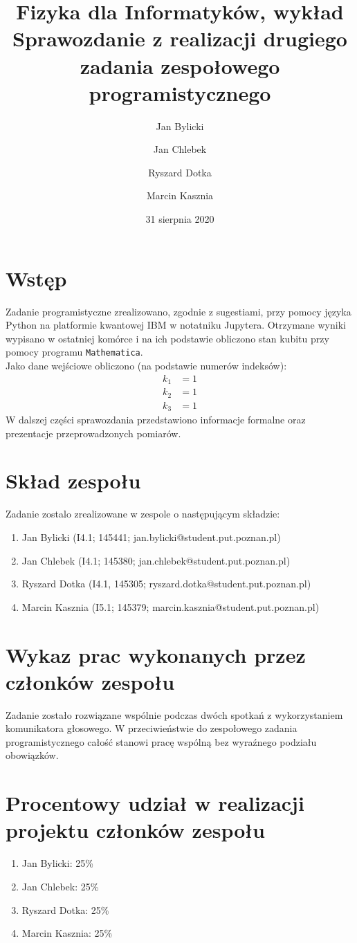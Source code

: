 \documentclass{article}
\title{Fizyka dla Informatyków, wykład\\ Sprawozdanie z realizacji drugiego zadania zespołowego programistycznego}
\author{Jan Bylicki \and Jan Chlebek \and Ryszard Dotka \and Marcin Kasznia}
\date{31 sierpnia 2020}
\begin{document}
\maketitle

\section{Wstęp}
Zadanie programistyczne zrealizowano, zgodnie z sugestiami, przy pomocy języka Python na platformie kwantowej IBM w notatniku Jupytera. Otrzymane wyniki wypisano w ostatniej komórce i na ich podstawie obliczono stan kubitu przy pomocy programu \verb+Mathematica+.\\
Jako dane wejściowe obliczono (na podstawie numerów indeksów):
\begin{align*}
    k_1&=1\\
    k_2&=1\\
    k_3&=1
\end{align*}
W dalszej części sprawozdania przedstawiono informacje formalne oraz prezentacje przeprowadzonych pomiarów.

\section{Skład zespołu}
Zadanie zostalo zrealizowane w zespole o następującym składzie:
\begin{enumerate}
    \item Jan Bylicki (I4.1; 145441; jan.bylicki@student.put.poznan.pl)
    \item Jan Chlebek (I4.1; 145380; jan.chlebek@student.put.poznan.pl)
    \item Ryszard Dotka (I4.1, 145305; ryszard.dotka@student.put.poznan.pl)
    \item Marcin Kasznia (I5.1; 145379; marcin.kasznia@student.put.poznan.pl)
\end{enumerate}

\section{Wykaz prac wykonanych przez członków zespołu}
    Zadanie zostało rozwiązane wspólnie podczas dwóch spotkań z wykorzystaniem komunikatora głosowego. W przeciwieństwie do zespołowego zadania programistycznego całość stanowi pracę wspólną bez wyraźnego podziału obowiązków.
    

\section{Procentowy udział w realizacji projektu członków zespołu}
\begin{enumerate}
    \item Jan Bylicki: 25\%
    \item Jan Chlebek: 25\%
    \item Ryszard Dotka: 25\%
    \item Marcin Kasznia: 25\%
\end{enumerate}
\end{document}
